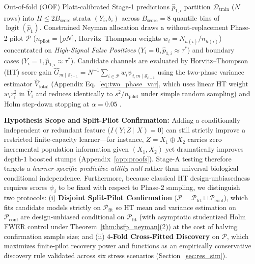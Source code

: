 \documentclass[11pt]{article}
\begin{document}
Out-of-fold (OOF) Platt-calibrated Stage-1 predictions $\hat{p}_{1,i}$ \citep{platt1999probabilistic} partition $\mathcal{D}_{\text{train}}$ ($N$ rows) into $H \le 2 B_{\text{score}}$ strata $(Y_i, b_i)$ across $B_{\text{score}}=8$ quantile bins of $\operatorname{logit}(\hat{p}_1)$. Constrained Neyman allocation \citep{lumley2010complex,tao2020optimal} draws a without-replacement Phase-2 pilot $\mathcal{P}$ ($n_{\text{pilot}} = \lfloor \rho N \rceil$, Horvitz--Thompson weights $w_i = N_{h(i)}/n_{h(i)}$) concentrated on \emph{High-Signal False Positives} ($Y_i=0, \hat{p}_{1,i} \approx \tau^*$) and boundary cases ($Y_i=1, \hat{p}_{1,i} \approx \tau^*$). Candidate channels are evaluated by Horvitz--Thompson (HT) score gain $\hat{G}_{m\mid\mathcal{S}_{t-1}} = N^{-1}\sum_{i\in\mathcal{P}} w_i \psi_{i,m\mid\mathcal{S}_{t-1}}$ using the two-phase variance estimator $\widehat{V}_{\text{total}}$ (Appendix Eq.~\eqref{eq:two_phase_var}, which uses linear HT weight $w_i r_i^2$ in $\widehat{V}_{\text{I}}$ and reduces identically to $s^2/n_{\text{pilot}}$ under simple random sampling) and Holm step-down stopping at $\alpha=0.05$ \citep{holm1979simple}.

\textbf{Hypothesis Scope and Split-Pilot Confirmation:} Adding a conditionally independent or redundant feature ($I(Y;Z\mid X)=0$) can still strictly improve a restricted finite-capacity learner---for instance, $Z = X_1 \oplus X_2$ carries zero incremental population information given $(X_1,X_2)$ yet dramatically improves depth-$1$ boosted stumps (Appendix~\ref{app:proofs}). Stage-A testing therefore targets a \emph{learner-specific predictive-utility null} rather than universal biological conditional independence. Furthermore, because classical HT design-unbiasedness requires scores $\psi_i$ to be fixed with respect to Phase-2 sampling, we distinguish two protocols: (i) \textbf{Disjoint Split-Pilot Confirmation} ($\mathcal{P} = \mathcal{P}_{\text{fit}} \sqcup \mathcal{P}_{\text{conf}}$), which fits candidate models strictly on $\mathcal{P}_{\text{fit}}$ so HT mean and variance estimation on $\mathcal{P}_{\text{conf}}$ are design-unbiased conditional on $\mathcal{P}_{\text{fit}}$ (with asymptotic studentized Holm FWER control under Theorem~\ref{thm:hsfp_neyman}(2)) at the cost of halving confirmation sample size; and (ii) \textbf{$4$-Fold Cross-Fitted Discovery} on $\mathcal{P}$, which maximizes finite-pilot recovery power and functions as an empirically conservative discovery rule validated across six stress scenarios (Section~\ref{sec:res_sim}).
\end{document}
